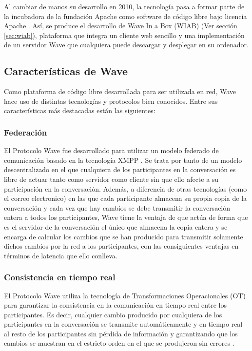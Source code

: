   Al cambiar de manos su desarrollo en 2010, la tecnología pasa a formar parte de la incubadora de la fundación Apache \cite{ref:apache_wave_about} como software de código libre bajo licencia Apache \cite{ref:apache_license}. Así, se produce el desarrollo de Wave In a Box (WIAB) (Ver sección \ref{sec:wiab}), plataforma que integra un cliente web sencillo y una implementación de un servidor Wave que cualquiera puede descargar y desplegar en su ordenador.
  
  \subsection{Características de Wave}
  
  Como plataforma de código libre desarrollada para ser utilizada en red, Wave hace uso de distintas tecnologías y protocolos bien conocidos. Entre sus características más destacadas están las siguientes:

    \subsubsection{Federación}\label{sssec:federation}
    
    El Protocolo Wave \cite{ref:wave_over_xmpp} fue desarrollado para utilizar un modelo federado \cite{ref:wave_federation} \cite{ref:wave_white_paper} de comunicación basado en la tecnología XMPP \cite{ref:xmpp} \cite{ref:wave_over_xmpp}. Se trata por tanto de un modelo descentralizado en el que cualquiera de los participantes en la conversación es libre de actuar tanto como servidor como cliente sin que ello afecte a su participación en la conversación. 
    Además, a diferencia de otras tecnologías (como el correo electronico) en las que cada participante almacena su propia copia de la conversación y cada vez que hay cambios se debe transmitir la conversación entera a todos los participantes, Wave tiene la ventaja de que actúa de forma que es el servidor de la conversación el único que almacena la copia entera y se encarga de calcular los cambios que se han producido para transmitir solamente dichos cambios por la red a los participantes, con las consiguientes ventajas en términos de latencia que ello conlleva. 

    \subsubsection{Consistencia en tiempo real}\label{sssec:realTime}
    
    El Protocolo Wave \cite{ref:wave_over_xmpp} utiliza la tecnología de Transformaciones Operacionales (OT) \cite{ref:how_ot_works} para garantizar la consistencia en la comunicación en tiempo real entre los participantes. Es decir, cualquier cambio producido por cualquiera de los participantes en la conversación se transmite automáticamente y en tiempo real al resto de los participantes sin pérdida de información y garantizando que los cambios se muestran en el estricto orden en el que se produjeron sin errores \cite{ref:wave_ot}.
    
